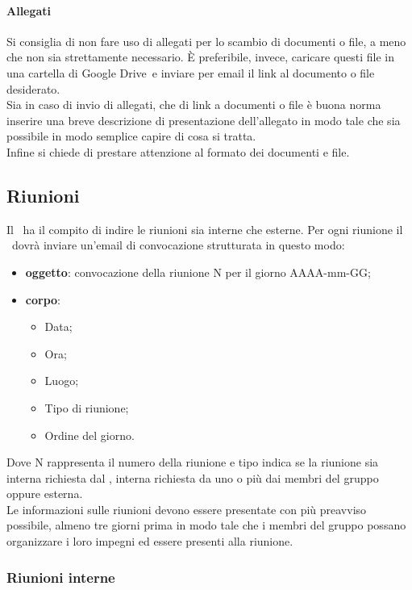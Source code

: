 \documentclass[../NormeProgetto.tex]{subfiles}
\begin{document}
			\paragraph{Allegati}
				Si consiglia di non fare uso di allegati per lo scambio di documenti o file, a meno che non sia strettamente necessario. È preferibile, invece, caricare questi file in una cartella di Google Drive\g\ e inviare per email il link al documento o file desiderato. \\ Sia in caso di invio di allegati, che di link a documenti o file è buona norma inserire una breve descrizione di presentazione dell'allegato in modo tale che sia possibile in modo semplice capire di cosa si tratta. \\ Infine si chiede di prestare attenzione al formato dei documenti e file.
	\subsection{Riunioni}
		Il \responsabilediprogetto\ ha il compito di indire le riunioni sia interne che esterne. Per ogni riunione il \responsabilediprogetto\ dovrà inviare un'email di convocazione strutturata in questo modo:
		\begin{itemize}
			\item \textbf{oggetto}: convocazione della riunione N per il giorno AAAA-mm-GG;
			\item \textbf{corpo}: 
			\begin{itemize}
				\item Data;
				\item Ora;
				\item Luogo;
				\item Tipo di riunione;
				\item Ordine del giorno.
				\end{itemize}
		\end{itemize}
		Dove N rappresenta il numero della riunione e tipo indica se la riunione sia interna richiesta dal \responsabilediprogetto, interna richiesta da uno o più dai membri del gruppo oppure esterna. \\
		Le informazioni sulle riunioni devono essere presentate con più preavviso possibile, almeno tre giorni prima in modo tale che i membri del gruppo possano organizzare i loro impegni ed essere presenti alla riunione.
		\subsubsection{Riunioni interne}
\end{document}
